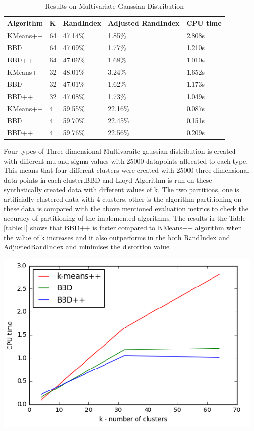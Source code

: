 \documentclass[conference]{IEEEtran}
\begin{document}
\begin{table}[h!]
\centering
\begin{tabular}{|p{2cm}||p{0.5cm}|p{1.5cm}|p{2cm}||p{1cm}|}
 \hline
Algorithm & K & RandIndex &Adjusted RandIndex & CPU time\\
 \hline
 KMeans++   &64 &  47.14\%   &1.85\% & 2.808s\\
 BBD &64 & 47.09\% & 1.77\% & 1.210s\\
 BBD++ &64 & 47.06\% & 1.68\% & 1.010s\\
 \hline
 KMeans++ & 32 & 48.01\% & 3.24\% & 1.652s\\
 BBD & 32 & 47.01\% & 1.62\% &  1.173s\\
 BBD++ & 32 & 47.08\% & 1.73\% & 1.049s\\
 \hline
 KMeans++ & 4 & 59.55\% & 22.16\% & 0.087s\\
 BBD & 4 & 59.70\% & 22.45\% &  0.151s\\
 BBD++ & 4 & 59.76\% & 22.56\% & 0.209s\\
 \hline
\end{tabular}
\hspace{1mm}
\caption{Results on Multivariate Gaussian Distribution}
\label{table:2}
\end{table}


Four types of Three dimensional Multivaraite gaussian distribution is created with different mu and sigma values with 25000 datapoints allocated to each type. This means that four different clusters were created with 25000 three dimensional data points in each cluster.BBD and Lloyd Algorithm is run on these synthetically created data with different values of k. The two partitions, one is artificially clustered data with 4 clusters, other is the algorithm partitioning on these data is compared with the above mentioned evaluation metrics to check the accuracy of partitioning of the implemented algorithms. The results in the Table \ref{table:1} shows that BBD++ is faster compared to KMeans++ algorithm when the value of k increases and it also outperforms in the both RandIndex and AdjustedRandIndex and minimises the distortion value. 

\includegraphics[scale =0.60]{plot.png}
\end{document}
